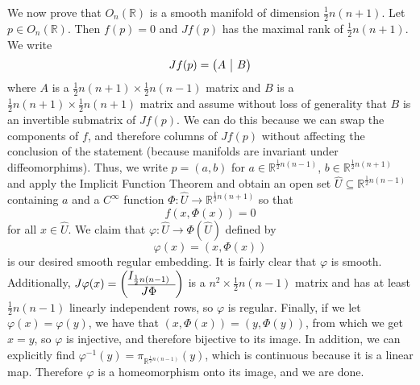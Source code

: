 \documentclass{../../../tex-setup/eh-homework}
\begin{document}
\begin{question}{40}
        We now prove that \(O_n(\mathbb{R})\) is a smooth manifold of dimension \(\frac{1}{2}n(n+1)\). Let \(p \in O_n(\mathbb{R})\). Then \(f(p) = 0\) and \(Jf(p)\) has the maximal rank of \(\frac{1}{2}n(n+1)\). We write
        \[
            Jf(p) = \left( \begin{array}{@{}c|c@{}}
                A & B
            \end{array} \right) 
        \]
        where \(A\) is a \(\frac{1}{2}n(n+1) \times \frac{1}{2}n(n-1)\) matrix and \(B\) is a \(\frac{1}{2}n(n+1) \times \frac{1}{2}n(n+1)\) matrix and assume without loss of generality that \(B\) is an invertible submatrix of \(Jf(p)\). We can do this because we can swap the components of \(f\), and therefore columns of \(Jf(p)\) without affecting the conclusion of the statement (because manifolds are invariant under diffeomorphims). Thus, we write \(p = (a,b)\) for \(a \in \mathbb{R}^{\frac{1}{2}n(n-1)}\), \(b \in \mathbb{R}^{\frac{1}{2}n(n+1)}\) and apply the Implicit Function Theorem and obtain an open set \(\hat{U} \subseteq \mathbb{R}^{\frac{1}{2}n(n-1)}\) containing \(a\) and a \(C^{\infty}\) function \(\Phi : \hat{U} \to \mathbb{R}^{\frac{1}{2}n(n+1)}\) so that
        \[
            f(x, \Phi(x)) = 0
        \]
        for all \(x \in \hat{U}\). We claim that \(\varphi: \hat{U} \to \Phi (\hat{U})\) defined by
        \[
            \varphi (x) = (x, \Phi (x))
        \]
        is our desired smooth regular embedding. It is fairly clear that \(\varphi\) is smooth. Additionally, \(J \varphi (x) = \left( \begin{array}{@{}cc@{}}
            I_{\frac{1}{2}n(n-1)} \\
            \hline
            J\Phi
        \end{array} \right) \) is a \(n^2 \times \frac{1}{2}n(n-1)\) matrix and has at least \(\frac{1}{2}n(n-1)\) linearly independent rows, so \(\varphi\) is regular. Finally, if we let \(\varphi (x) = \varphi (y)\), we have that \((x,\Phi (x)) = (y, \Phi (y))\), from which we get \(x=y\), so \(\varphi\) is injective, and therefore bijective to its image. In addition, we can explicitly find \(\varphi^{-1} (y) = \pi _{\mathbb{R}^{\frac{1}{2}n(n-1)}}(y)\), which is continuous because it is a linear map. Therefore \(\varphi\) is a homeomorphism onto its image, and we are done.
    \end{question}
\end{document}

